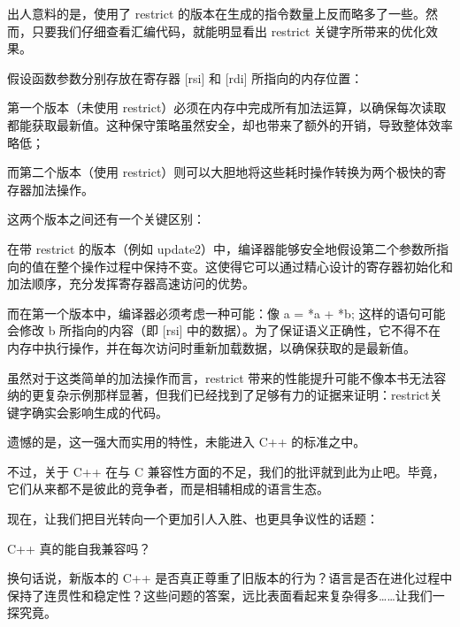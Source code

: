 出人意料的是，使用了 restrict 的版本在生成的指令数量上反而略多了一些。然而，只要我们仔细查看汇编代码，就能明显看出 restrict 关键字所带来的优化效果。

假设函数参数分别存放在寄存器 [rsi] 和 [rdi] 所指向的内存位置：

第一个版本（未使用 restrict）必须在内存中完成所有加法运算，以确保每次读取都能获取最新值。这种保守策略虽然安全，却也带来了额外的开销，导致整体效率略低；

而第二个版本（使用 restrict）则可以大胆地将这些耗时操作转换为两个极快的寄存器加法操作。

这两个版本之间还有一个关键区别：

在带 restrict 的版本（例如 update2）中，编译器能够安全地假设第二个参数所指向的值在整个操作过程中保持不变。这使得它可以通过精心设计的寄存器初始化和加法顺序，充分发挥寄存器高速访问的优势。

而在第一个版本中，编译器必须考虑一种可能：像 a = *a + *b; 这样的语句可能会修改 b 所指向的内容（即 [rsi] 中的数据）。为了保证语义正确性，它不得不在内存中执行操作，并在每次访问时重新加载数据，以确保获取的是最新值。

虽然对于这类简单的加法操作而言，restrict 带来的性能提升可能不像本书无法容纳的更复杂示例那样显著，但我们已经找到了足够有力的证据来证明：restrict关键字确实会影响生成的代码。

遗憾的是，这一强大而实用的特性，未能进入 C++ 的标准之中。

不过，关于 C++ 在与 C 兼容性方面的不足，我们的批评就到此为止吧。毕竟，它们从来都不是彼此的竞争者，而是相辅相成的语言生态。

现在，让我们把目光转向一个更加引人入胜、也更具争议性的话题：

C++ 真的能自我兼容吗？

换句话说，新版本的 C++ 是否真正尊重了旧版本的行为？语言是否在进化过程中保持了连贯性和稳定性？这些问题的答案，远比表面看起来复杂得多……让我们一探究竟。











